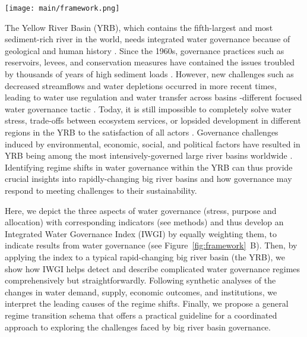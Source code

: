 \documentclass[draft]{agujournal2019}
\begin{document}
\begin{figure*}[!ht]
	\centering
	\texttt{[image: main/framework.png]}
	\caption{
		Identifying the water governance regimes in transitions of a hydrosocial cycle with an integrated water governance index (IWGI). Water stress (S), purposes of water services (P), and water allocation (A) are three aspects to be considered (\textbf{A.}). Along with hydrosocial-cycle transitions, a human-dominated regime influences these aspects of water governance. For example, the construction of reservoirs (1) aims to alleviate water stress; growth of energy and industry (2); water-lead intensive agriculture (3); conveyance system (4) controls water allocation.
		Therefore, the methodology is to combine three aspects' corresponding indicators, and then an abrupt change of the IWGI can indicate a regime shift in water governance (\textbf{B.}).
	}
	\label{fig:framework}
\end{figure*}


The Yellow River Basin (YRB), which contains the fifth-largest and most sediment-rich river in the world, needs integrated water governance because of geological and human history
\cite{mostern2021,best2019}.
Since the 1960s, governance practices such as reservoirs, levees, and conservation measures have contained the issues troubled by thousands of years of high sediment loads
\cite{wang2016e,song2020a}.
However, new challenges such as decreased streamflows and water depletions occurred in more recent times, leading to water use regulation and water transfer across basins -different focused water governance tactic
\cite{wang2019c}.
Today, it is still impossible to completely solve water stress, trade-offs between ecosystem services, or lopsided development in different regions in the YRB to the satisfaction of all actors
\cite{wohlfart2016a}.
Governance challenges induced by environmental, economic, social, and political factors have resulted in YRB being among the most intensively-governed large river basins worldwide \cite{nickum2021}.
Identifying regime shifts in water governance within the YRB can thus provide crucial insights into rapidly-changing big river basins and how governance may respond to meeting challenges to their sustainability.

Here, we depict the three aspects of water governance (stress, purpose and allocation) with corresponding indicators (see methods) and thus develop an Integrated Water Governance Index (IWGI) by equally weighting them, to indicate results from water governance (see Figure~\ref{fig:framework}~B).
Then, by applying the index to a typical rapid-changing big river basin (the YRB), we show how IWGI helps detect and describe complicated water governance regimes comprehensively but straightforwardly.
Following synthetic analyses of the changes in water demand, supply, economic outcomes, and institutions, we interpret the leading causes of the regime shifts.
Finally, we propose a general regime transition schema that offers a practical guideline for a coordinated approach to exploring the challenges faced by big river basin governance.
\end{document}
